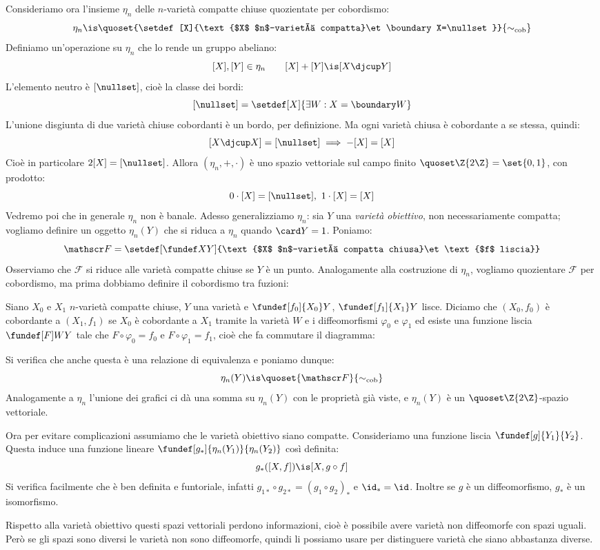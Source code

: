 Consideriamo ora l'insieme $\eta_n$ delle $n$-varietà compatte chiuse quozientate per cobordismo:
\[\eta_n\is\quoset{\setdef[X]{\text{$X$ $n$-varietà compatta}\et\boundary X=\nullset}}{\sim_\text{cob}}\]
Definiamo un'operazione su $\eta_n$ che lo rende un gruppo abeliano:
\[[X],[Y]\in\eta_n\qquad[X]+[Y]\is[X\djcup Y]\]
L'elemento neutro è $[\nullset]$, cioè la classe dei bordi:
\[[\nullset]=\setdef[X]{\exists W:X=\boundary W}\]
L'unione disgiunta di due varietà chiuse cobordanti è un bordo, per definizione. Ma ogni varietà chiusa è cobordante a se stessa, quindi:
\[[X\djcup X]=[\nullset]\implies-[X]=[X]\]
Cioè in particolare $2[X]=[\nullset]$. Allora $(\eta_n,+,\cdot)$ è uno spazio vettoriale sul campo finito $\quoset\Z{2\Z}=\set{0,1}$, con prodotto:
\[0\cdot[X]=[\nullset],\ 1\cdot[X]=[X]\]
Vedremo poi che in generale $\eta_n$ non è banale. Adesso generalizziamo $\eta_n$: sia $Y$ una \emph{varietà obiettivo}, non necessariamente compatta; vogliamo definire un oggetto $\eta_n(Y)$ che si riduca a $\eta_n$ quando $\card Y=1$. Poniamo:
\[\mathscr F=\setdef[\fundef XY]{\text{$X$ $n$-varietà compatta chiusa}\et\text{$f$ liscia}}\]
Osserviamo che $\mathscr F$ si riduce alle varietà compatte chiuse se $Y$ è un punto. Analogamente alla costruzione di $\eta_n$, vogliamo quozientare $\mathscr F$ per cobordismo, ma prima dobbiamo definire il cobordismo tra fuzioni:

\begin{defn}
	Siano $X_0$ e $X_1$ $n$-varietà compatte chiuse, $Y$ una varietà e $\fundef[f_0]{X_0}Y$, $\fundef[f_1]{X_1}Y$ lisce. Diciamo che $(X_0,f_0)$ è cobordante a $(X_1,f_1)$ se $X_0$ è cobordante a $X_1$ tramite la varietà $W$ e i diffeomorfismi $\varphi_0$ e $\varphi_1$ ed esiste una funzione liscia $\fundef[F]WY$ tale che $F\circ\varphi_0=f_0$ e $F\circ\varphi_1=f_1$, cioè che fa commutare il diagramma:
	\begin{center}
		
	\end{center}
\end{defn}

Si verifica che anche questa è una relazione di equivalenza e poniamo dunque:
\[\eta_n(Y)\is\quoset{\mathscr F}{\sim_\text{cob}}\]
Analogamente a $\eta_n$ l'unione dei grafici ci dà una somma su $\eta_n(Y)$ con le proprietà già viste, e $\eta_n(Y)$ è un $\quoset\Z{2\Z}$-spazio vettoriale.

Ora per evitare complicazioni assumiamo che le varietà obiettivo siano compatte. Consideriamo una funzione liscia $\fundef[g]{Y_1}{Y_2}$. Questa induce una funzione lineare $\fundef[g_*]{\eta_n(Y_1)}{\eta_n(Y_2)}$ così definita:
\[g_*([X,f])\is[X,g\circ f]\]
Si verifica facilmente che è ben definita e funtoriale, infatti $g_{1*}\circ g_{2*}=(g_1\circ g_2)_*$ e $\id_*=\id$. Inoltre se $g$ è un diffeomorfismo, $g_*$ è un isomorfismo.

Rispetto alla varietà obiettivo questi spazi vettoriali perdono informazioni, cioè è possibile avere varietà non diffeomorfe con spazi uguali. Però se gli spazi sono diversi le varietà non sono diffeomorfe, quindi li possiamo usare per distinguere varietà che siano abbastanza diverse.

